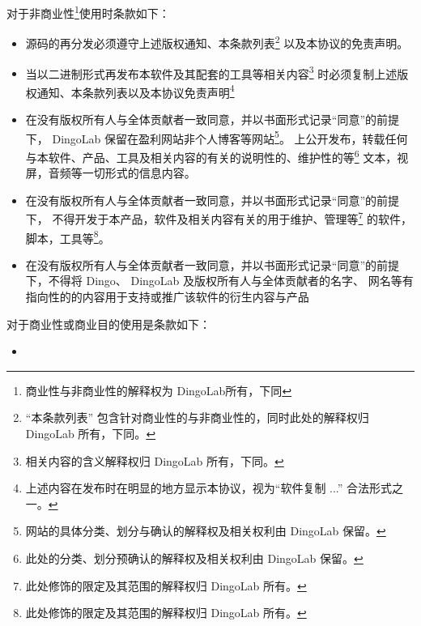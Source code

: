   对于非商业性\footnote{商业性与非商业性的解释权为 DingoLab所有，下同}使用时条款如下：
  \begin{itemize}
    \item 源码的再分发必须遵守上述版权通知、本条款列表\footnote{“本条款列表” 包含针对商业性的与非商业性的，同时此处的解释权归 DingoLab 所有，下同。}
      以及本协议的免责声明。
    \item 当以二进制形式再发布本软件及其配套的工具等相关内容\footnote{相关内容的含义解释权归 DingoLab 所有，下同。}
      时必须复制上述版权通知、本条款列表以及本协议免责声明\footnote{上述内容在发布时在明显的地方显示本协议，视为“软件复制 ...” 合法形式之一。}
    \item 在没有版权所有人与全体贡献者一致同意，并以书面形式记录“同意”的前提下，
      DingoLab 保留在盈利网站非个人博客等网站\footnote{网站的具体分类、划分与确认的解释权及相关权利由 DingoLab 保留。}。
      上公开发布，转载任何与本软件、产品、工具及相关内容的有关的说明性的、维护性的等\footnote{此处的分类、划分预确认的解释权及相关权利由 DingoLab 保留。}
      文本，视屏，音频等一切形式的信息内容。
    \item 在没有版权所有人与全体贡献者一致同意，并以书面形式记录“同意”的前提下，
      不得开发于本产品，软件及相关内容有关的用于维护、管理等\footnote{此处修饰的限定及其范围的解释权归 DingoLab 所有。}
      的软件，脚本，工具等\footnote{此处修饰的限定及其范围的解释权归 DingoLab 所有。}。
    \item 在没有版权所有人与全体贡献者一致同意，并以书面形式记录“同意”的前提下，不得将 Dingo、 DingoLab 及版权所有人与全体贡献者的名字、
      网名等有指向性的的内容用于支持或推广该软件的衍生内容与产品
  \end{itemize}

  对于商业性或商业目的使用是条款如下：
  \begin{itemize}
    \item
  \end{itemize}

